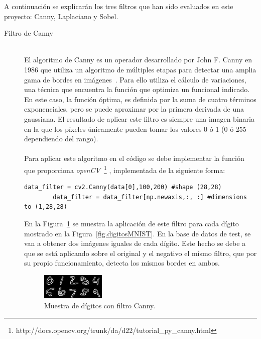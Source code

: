 A continuación se explicarán los tres filtros que han sido evaluados en este proyecto: Canny, Laplaciano y Sobel.

\begin{description}
	\item[Filtro de Canny] \hfill 
	\vspace{5pt}
	\\
	El algoritmo de Canny es un operador desarrollado por John F. Canny en 1986 que utiliza un algoritmo de múltiples etapas para detectar una amplia gama de bordes en imágenes~\cite{4767851}. Para ello utiliza el cálculo de variaciones, una técnica que encuentra la función que optimiza un funcional indicado. En este caso, la función óptima, es definida por la suma de cuatro términos exponenciales, pero se puede aproximar por la primera derivada de una gaussiana. El resultado de aplicar este filtro es siempre una imagen binaria en la que los píxeles únicamente pueden tomar los valores 0 ó 1 (0 ó 255 dependiendo del rango).\\
	\vspace{-10pt}
	\\
	Para aplicar este algoritmo en el código se debe implementar la función que proporciona \textit{openCV}~\footnote{http://docs.opencv.org/trunk/da/d22/tutorial\_py\_canny.html} , implementada de la siguiente forma:
	\vspace{10pt}
	\begin{lstlisting}[frame=single]
		data_filter = cv2.Canny(data[0],100,200) #shape (28,28)
		data_filter = data_filter[np.newaxis,:, :] #dimensions to (1,28,28)
	\end{lstlisting}
	En la Figura~\ref{fig.canny} se muestra la aplicación de este filtro para cada dígito mostrado en la Figura~\ref{fig.digitosMNIST}. En la base de datos de test, se van a obtener dos imágenes iguales de cada dígito. Este hecho se debe a que se está aplicando sobre el original y el negativo el mismo filtro, que por su propio funcionamiento, detecta los mismos bordes en ambos.
	
	\begin{figure}[H]
		\begin{center}
			\includegraphics[width=0.3\textwidth]{figures/canny}
			\caption{Muestra de dígitos con filtro Canny.}
			\label{fig.canny}
		\end{center}
	\end{figure}
	

\end{description}
